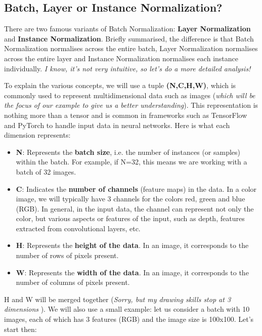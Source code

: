 \subsection{Batch, Layer or Instance Normalization?}

There are two famous variants of Batch Normalization: \textbf{Layer Normalization} and \textbf{Instance Normalization}. Briefly summarised, the difference is that Batch Normalization normalises across the entire batch, Layer Normalization normalises across the entire layer and Instance Normalization normalises each instance individually. \textit{I know, it's not very intuitive, so let's do a more detailed analysis!}

To explain the various concepts, we will use a tuple \textbf{(N,C,H,W)}, which is commonly used to represent multidimensional data such as images (\textit{which will be the focus of our example to give us a better understanding}). This representation is nothing more than a tensor and is common in frameworks such as TensorFlow and PyTorch to handle input data in neural networks. Here is what each dimension represents:
\begin{itemize}
    \item \textbf{N}: Represents the \textbf{batch size}, i.e. the number of instances (or samples) within the batch. For example, if N=32, this means we are working with a batch of 32 images.
    \item \textbf{C}: Indicates the \textbf{number of channels} (feature maps) in the data. In a color image, we will typically have 3 channels for the colors red, green and blue (RGB). In general, in the input data, the channel can represent not only the color, but various aspects or features of the input, such as depth, features extracted from convolutional layers, etc.
    \item \textbf{H}: Represents the \textbf{height of the data}. In an image, it corresponds to the number of rows of pixels present.
    \item \textbf{W}: Represents the \textbf{width of the data}. In an image, it corresponds to the number of columns of pixels present.
\end{itemize}
H and W will be merged together (\textit{Sorry, but my drawing skills stop at 3 dimensions \faSadTear[regular]}).
We will also use a small example: let us consider a batch with 10 images, each of which has 3 features (RGB) and the image size is 100x100. Let's start then:


